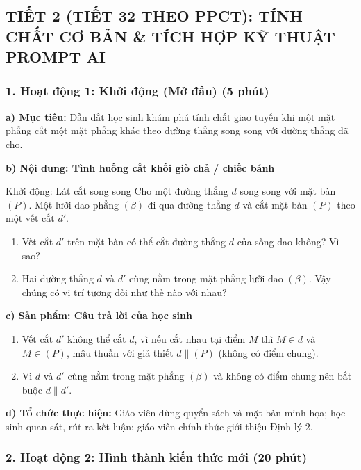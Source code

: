 \documentclass[12pt, a4paper]{article}
\begin{document}
\subsection*{TIẾT 2 (TIẾT 32 THEO PPCT): TÍNH CHẤT CƠ BẢN \& TÍCH HỢP KỸ THUẬT PROMPT AI}

\subsubsection*{1. Hoạt động 1: Khởi động (Mở đầu) (5 phút)}

\noindent \textbf{a) Mục tiêu:}
Dẫn dắt học sinh khám phá tính chất giao tuyến khi một mặt phẳng cắt một mặt phẳng khác theo đường thẳng song song với đường thẳng đã cho.

\noindent \textbf{b) Nội dung: Tình huống cắt khối giò chả / chiếc bánh}
\begin{pedabox}{Khởi động: Lát cắt song song}
Cho một đường thẳng $d$ song song với mặt bàn $(P)$. Một lưỡi dao phẳng $(\beta)$ đi qua đường thẳng $d$ và cắt mặt bàn $(P)$ theo một vết cắt $d'$.
\begin{enumerate}[leftmargin=0.6cm]
    \item Vết cắt $d'$ trên mặt bàn có thể cắt đường thẳng $d$ của sống dao không? Vì sao?
    \item Hai đường thẳng $d$ và $d'$ cùng nằm trong mặt phẳng lưỡi dao $(\beta)$. Vậy chúng có vị trí tương đối như thế nào với nhau?
\end{enumerate}
\end{pedabox}

\noindent \textbf{c) Sản phẩm: Câu trả lời của học sinh}
\begin{enumerate}[leftmargin=0.6cm]
    \item Vết cắt $d'$ không thể cắt $d$, vì nếu cắt nhau tại điểm $M$ thì $M \in d$ và $M \in (P)$, mâu thuẫn với giả thiết $d \parallel (P)$ (không có điểm chung).
    \item Vì $d$ và $d'$ cùng nằm trong mặt phẳng $(\beta)$ và không có điểm chung nên bắt buộc $d \parallel d'$.
\end{enumerate}

\noindent \textbf{d) Tổ chức thực hiện:}
Giáo viên dùng quyển sách và mặt bàn minh họa; học sinh quan sát, rút ra kết luận; giáo viên chính thức giới thiệu Định lý 2.

\subsubsection*{2. Hoạt động 2: Hình thành kiến thức mới (20 phút)}
\end{document}
